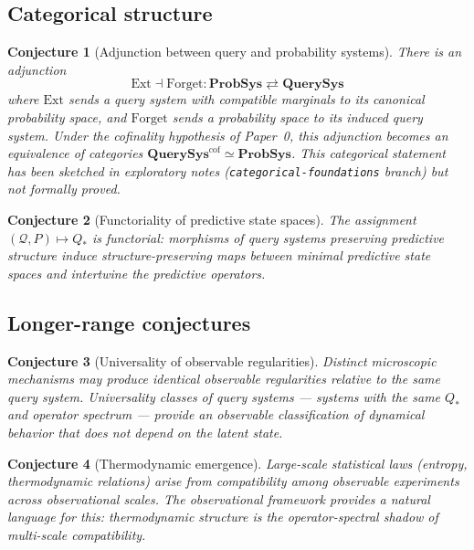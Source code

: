 \documentclass[11pt]{article}
\newtheorem{conjecture}{Conjecture}
\begin{document}
\subsection*{Categorical structure}

\begin{conjecture}[Adjunction between query and probability systems]
\label{conj:adjunction}
There is an adjunction
\[
\mathrm{Ext} \dashv \mathrm{Forget} : \mathbf{ProbSys} \rightleftarrows \mathbf{QuerySys}
\]
where $\mathrm{Ext}$ sends a query system with compatible marginals to
its canonical probability space, and $\mathrm{Forget}$ sends a
probability space to its induced query system.  Under the cofinality
hypothesis of Paper~0, this adjunction becomes an equivalence of
categories $\mathbf{QuerySys}^{\mathrm{cof}} \simeq \mathbf{ProbSys}$.
This categorical statement has been sketched in exploratory notes
(\texttt{categorical-foundations} branch) but not formally proved.
\end{conjecture}

\begin{conjecture}[Functoriality of predictive state spaces]
\label{conj:functorial-predictive-state}
The assignment $(\mathcal Q, P) \mapsto Q_*$ is functorial: morphisms
of query systems preserving predictive structure induce
structure-preserving maps between minimal predictive state spaces and
intertwine the predictive operators.
\end{conjecture}

\subsection*{Longer-range conjectures}

\begin{conjecture}[Universality of observable regularities]
Distinct microscopic mechanisms may produce identical observable
regularities relative to the same query system.  Universality classes
of query systems --- systems with the same $Q_*$ and operator spectrum
--- provide an observable classification of dynamical behavior that
does not depend on the latent state.
\end{conjecture}

\begin{conjecture}[Thermodynamic emergence]
Large-scale statistical laws (entropy, thermodynamic relations) arise
from compatibility among observable experiments across observational
scales.  The observational framework provides a natural language for
this: thermodynamic structure is the operator-spectral shadow of
multi-scale compatibility.
\end{conjecture}
\end{document}
